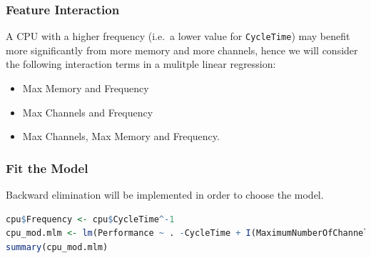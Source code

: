 \documentclass[
]{article}
\newcommand{\passthrough}[1]{#1}
\providecommand{\tightlist}{%
  \setlength{\itemsep}{0pt}\setlength{\parskip}{0pt}}
\begin{document}
\hypertarget{feature-interaction}{%
\subsubsection{Feature Interaction}\label{feature-interaction}}

A CPU with a higher frequency (i.e.~a lower value for
\passthrough{\lstinline!CycleTime!}) may benefit more significantly from
more memory and more channels, hence we will consider the following
interaction terms in a mulitple linear regression:

\begin{itemize}
\tightlist
\item
  Max Memory and Frequency
\item
  Max Channels and Frequency
\item
  Max Channels, Max Memory and Frequency.
\end{itemize}

\hypertarget{fit-the-model}{%
\subsubsection{Fit the Model}\label{fit-the-model}}

Backward elimination will be implemented in order to choose the model.

\begin{lstlisting}[language=R]
cpu$Frequency <- cpu$CycleTime^-1
cpu_mod.mlm <- lm(Performance ~ . -CycleTime + I(MaximumNumberOfChannels * MaximumMainMemory * Frequency)  + I(MaximumNumberOfChannels * Frequency) + I( MaximumMainMemory * Frequency)   , data = cpu)
summary(cpu_mod.mlm)
\end{lstlisting}
\end{document}
